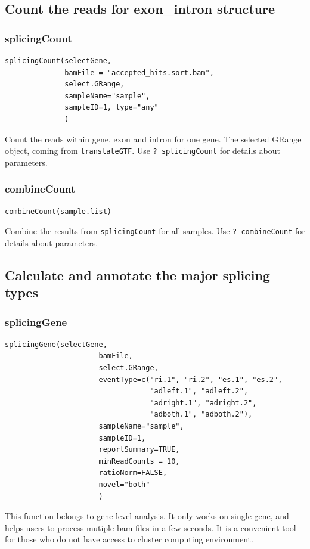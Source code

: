 \documentclass[a4paper]{article}
\begin{document}
\subsection{Count the reads for exon\_intron structure}
\subsubsection{splicingCount}
\begin{verbatim}
splicingCount(selectGene,
              bamFile = "accepted_hits.sort.bam",
              select.GRange, 
              sampleName="sample",
              sampleID=1, type="any"
              )
\end{verbatim}
Count the reads within gene, exon and intron for one gene. The selected GRange object, coming
from \texttt{translateGTF}.
\newline  \newline
Use \texttt{? splicingCount} for details about parameters. \newline

\subsubsection{combineCount}
\begin{verbatim}
combineCount(sample.list)
\end{verbatim}
Combine the results from \texttt{splicingCount} for all samples.
\newline  \newline
Use \texttt{? combineCount} for details about parameters. \newline

\subsection{Calculate and annotate the major splicing types}
\subsubsection{splicingGene}

\begin{verbatim}
splicingGene(selectGene,
                      bamFile,
                      select.GRange,
                      eventType=c("ri.1", "ri.2", "es.1", "es.2", 
                                  "adleft.1", "adleft.2", 
                                  "adright.1", "adright.2",
                                  "adboth.1", "adboth.2"),
                      sampleName="sample",
                      sampleID=1, 
                      reportSummary=TRUE,
                      minReadCounts = 10, 
                      ratioNorm=FALSE, 
                      novel="both"
                      )
\end{verbatim}
This function belongs to gene-level analysis. It only works on single gene, and helps users 
to process mutiple bam files in a few seconds. It is a convenient tool for those who do not
have access to cluster computing environment. 
\end{document}
